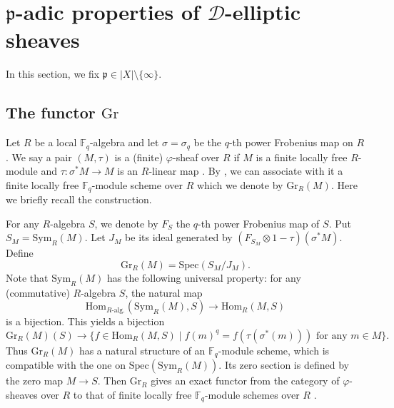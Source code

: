 \documentclass[10pt]{amsart}
\theoremstyle{plain}
\theoremstyle{definition}
\newcommand{\Hom}{\mathrm{Hom}}
\newcommand{\Spec}{\mathrm{Spec}}
\newcommand{\Sym}{\mathrm{Sym}}
\newcommand{\Gr}{\mathrm{Gr}}
\newcommand{\bF}{\mathbb{F}}
\newcommand{\sD}{\mathscr{D}}
\newcommand{\frp}{\mathfrak{p}}
\begin{document}



\section{$\frp$-adic properties of $\sD$-elliptic sheaves}\label{SecP-adic}

In this section, we fix $\frp\in |X|\setminus\{\infty\}$.

\subsection{The functor $\Gr$}\label{SubsecGr}

Let $R$ be a local $\bF_q$-algebra and let $\sigma=\sigma_q$ be the $q$-th power Frobenius map on $R$.
We say a pair $(M,\tau)$ is a (finite) $\varphi$-sheaf over $R$ if $M$ is a finite locally free $R$-module 
and $\tau: \sigma^*M\to M$ is an $R$-linear map \cite[\S2]{Dri_F}.
By \cite[Proposition 2.1]{Dri_F}, we can associate with it
a finite locally free $\bF_q$-module scheme over $R$ which we denote by $\Gr_R(M)$.
Here we briefly recall the construction.

For any $R$-algebra $S$, we denote by $F_S$ the $q$-th power Frobenius map of $S$.
Put $S_M=\Sym_R(M)$. 
Let $J_M$ be its ideal generated by $(F_{S_M}\otimes 1-\tau)(\sigma^*M)$. Define
\[
\Gr_R(M)=\Spec(S_M/J_M).
\]
Note that $\Sym_R(M)$ has the following universal property: for any (commutative) $R$-algebra $S$,
the natural map
\[
\Hom_{R\text{-alg.}}(\Sym_R(M),S)\to \Hom_R(M,S)
\]
is a bijection. This yields a bijection
\begin{equation}\label{EqnGrVP}
\Gr_R(M)(S)\to \{f\in \Hom_R(M,S)\mid f(m)^q=f(\tau(\sigma^*(m)))\text{ for any }m\in M\}.
\end{equation}
Thus $\Gr_R(M)$ has a natural structure of an $\bF_q$-module scheme, which is compatible with the one on $\Spec(\Sym_R(M))$.
Its zero section is defined by the zero map $M\to S$. 
Then $\Gr_R$ gives an exact functor from the category of $\varphi$-sheaves over $R$ to that of finite locally free
$\bF_q$-module schemes over $R$ \cite[Proposition 2.1]{Dri_F}.
\end{document}
